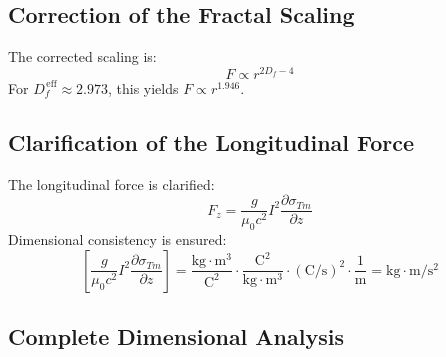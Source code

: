 	\subsection{Correction of the Fractal Scaling}
	The corrected scaling is:
	\begin{equation}
		F \propto r^{2D_f - 4} \label{eq:fractal_scaling_final}
	\end{equation}
	For $D_f^{\,\text{eff}} \approx 2.973$, this yields $F \propto r^{1.946}$.
	
	\subsection{Clarification of the Longitudinal Force}
	The longitudinal force is clarified:
	\begin{equation}
		F_z = \frac{g}{\mu_0 c^2} I^2 \frac{\partial \sigma_{Tm}}{\partial z} \label{eq:long_force_final}
	\end{equation}
	Dimensional consistency is ensured:
	\begin{equation}
		\left[\frac{g}{\mu_0 c^2} I^2 \frac{\partial \sigma_{Tm}}{\partial z}\right] = \frac{\text{kg} \cdot \text{m}^3}{\text{C}^2} \cdot \frac{\text{C}^2}{\text{kg} \cdot \text{m}^3} \cdot (\text{C}/\text{s})^2 \cdot \frac{1}{\text{m}} = \text{kg} \cdot \text{m}/\text{s}^2
	\end{equation}
	
	\subsection{Complete Dimensional Analysis}
	\begin{table}[h]
		\centering
		\caption{Consistent dimensional definitions in the T0 model}
		\label{tab:dimensions}
	\end{table}
	
